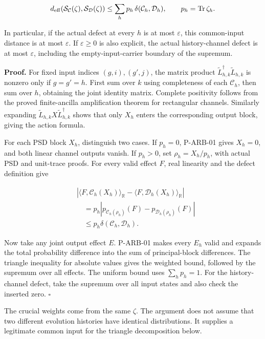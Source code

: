 \documentclass[
  11pt,
  oneside]{book}
\begin{document}
\[
d_{\rm eff}(\mathcal S_{\mathcal C}(\zeta),
             \mathcal S_{\mathcal D}(\zeta))
\le \sum_h p_h\,\delta(\mathcal C_h,\mathcal D_h),
\qquad p_h=\operatorname{Tr}\zeta_h.
\]

In particular, if the actual defect at every \(h\) is at most
\(\varepsilon\), this common-input distance is at most \(\varepsilon\).
If \(\varepsilon\ge0\) is also explicit, the actual history-channel
defect is at most \(\varepsilon\), including the empty-input-carrier
boundary of the supremum.

\textbf{Proof.} For fixed input indices \((g,i),(g',j)\), the matrix
product \(\widetilde L_{h,k}^\dagger\widetilde L_{h,k}\) is nonzero only
if \(g=g'=h\). First sum over \(k\) using completeness of each
\(\mathcal C_h\), then sum over \(h\), obtaining the joint identity
matrix. Complete positivity follows from the proved finite-ancilla
amplification theorem for rectangular channels. Similarly expanding
\(\widetilde L_{h,k}X\widetilde L_{h,k}^\dagger\) shows that only
\(X_h\) enters the corresponding output block, giving the action
formula.

For each PSD block \(X_h\), distinguish two cases. If \(p_h=0\),
P-ARB-01 gives \(X_h=0\), and both linear channel outputs vanish. If
\(p_h>0\), set \(\rho_h=X_h/p_h\), with actual PSD and unit-trace
proofs. For every valid effect \(F\), real linearity and the defect
definition give

\[
\begin{aligned}
&\left|\langle F,\mathcal C_h(X_h)\rangle_{\mathbb R}
 -\langle F,\mathcal D_h(X_h)\rangle_{\mathbb R}\right|\\
&\quad=p_h\left|p_{\mathcal C_h(\rho_h)}(F)
                 -p_{\mathcal D_h(\rho_h)}(F)\right|\\
&\quad\le p_h\delta(\mathcal C_h,\mathcal D_h).
\end{aligned}
\]

Now take any joint output effect \(E\). P-ARB-01 makes every \(E_h\)
valid and expands the total probability difference into the sum of
principal-block differences. The triangle inequality for absolute values
gives the weighted bound, followed by the supremum over all effects. The
uniform bound uses \(\sum_hp_h=1\). For the history-channel defect, take
the supremum over all input states and also check the inserted zero.
\(\square\)

The crucial weights come from the same \(\zeta\). The argument does not
assume that two different evolution histories have identical
distributions. It supplies a legitimate common input for the triangle
decomposition below.
\end{document}
